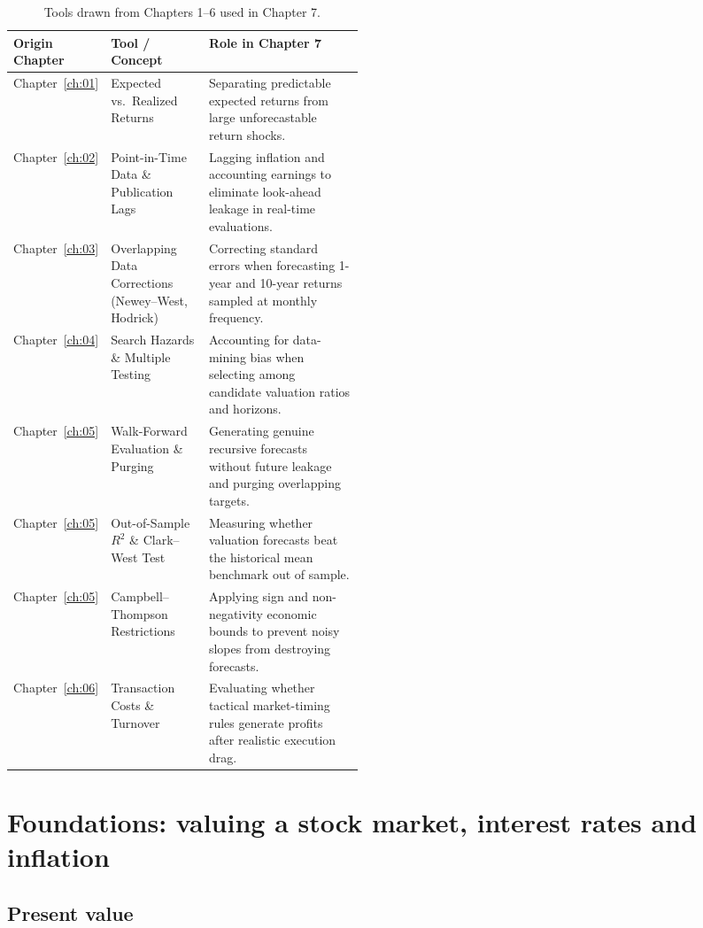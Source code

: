 \begin{table}[htbp]
\centering
\small
\caption{Tools drawn from Chapters 1--6 used in Chapter 7.}
\label{tab:07-tools}
\begin{tabularx}{0.95\linewidth}{@{}>{\raggedright\arraybackslash}p{0.18\linewidth}>{\raggedright\arraybackslash}p{0.28\linewidth}>{\raggedright\arraybackslash}X@{}}
\toprule
Origin Chapter & Tool / Concept & Role in Chapter 7 \\
\midrule
Chapter~\ref{ch:01} & Expected vs.\ Realized Returns & Separating predictable expected returns from large unforecastable return shocks. \\
Chapter~\ref{ch:02} & Point-in-Time Data \& Publication Lags & Lagging inflation and accounting earnings to eliminate look-ahead leakage in real-time evaluations. \\
Chapter~\ref{ch:03} & Overlapping Data Corrections (Newey--West, Hodrick) & Correcting standard errors when forecasting 1-year and 10-year returns sampled at monthly frequency. \\
Chapter~\ref{ch:04} & Search Hazards \& Multiple Testing & Accounting for data-mining bias when selecting among candidate valuation ratios and horizons. \\
Chapter~\ref{ch:05} & Walk-Forward Evaluation \& Purging & Generating genuine recursive forecasts without future leakage and purging overlapping targets. \\
Chapter~\ref{ch:05} & Out-of-Sample $R^2$ \& Clark--West Test & Measuring whether valuation forecasts beat the historical mean benchmark out of sample. \\
Chapter~\ref{ch:05} & Campbell--Thompson Restrictions & Applying sign and non-negativity economic bounds to prevent noisy slopes from destroying forecasts. \\
Chapter~\ref{ch:06} & Transaction Costs \& Turnover & Evaluating whether tactical market-timing rules generate profits after realistic execution drag. \\
\bottomrule
\end{tabularx}
\end{table}

\section{Foundations: valuing a stock market, interest rates and inflation}
\label{sec:07-foundations}

\subsection{Present value}

